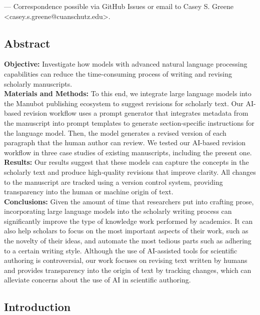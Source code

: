 \documentclass[
]{article}
\begin{document}
\leavevmode{}%
\Letter --- Correspondence possible via GitHub Issues
or email to
Casey S. Greene \textless casey.s.greene@cuanschutz.edu\textgreater.

\hypertarget{abstract}{%
\subsection{Abstract}\label{abstract}}

\textbf{Objective:} Investigate how models with advanced natural language processing capabilities can reduce the time-consuming process of writing and revising scholarly manuscripts.\\
\textbf{Materials and Methods:} To this end, we integrate large language models into the Manubot publishing ecosystem to suggest revisions for scholarly text.
Our AI-based revision workflow uses a prompt generator that integrates metadata from the manuscript into prompt templates to generate section-specific instructions for the language model.
Then, the model generates a revised version of each paragraph that the human author can review.
We tested our AI-based revision workflow in three case studies of existing manuscripts, including the present one.\\
\textbf{Results:} Our results suggest that these models can capture the concepts in the scholarly text and produce high-quality revisions that improve clarity.
All changes to the manuscript are tracked using a version control system, providing transparency into the human or machine origin of text.\\
\textbf{Conclusions:} Given the amount of time that researchers put into crafting prose, incorporating large language models into the scholarly writing process can significantly improve the type of knowledge work performed by academics.
It can also help scholars to focus on the most important aspects of their work, such as the novelty of their ideas, and automate the most tedious parts such as adhering to a certain writing style.
Although the use of AI-assisted tools for scientific authoring is controversial, our work focuses on revising text written by humans and provides transparency into the origin of text by tracking changes, which can alleviate concerns about the use of AI in scientific authoring.

\hypertarget{introduction}{%
\subsection{Introduction}\label{introduction}}
\end{document}
